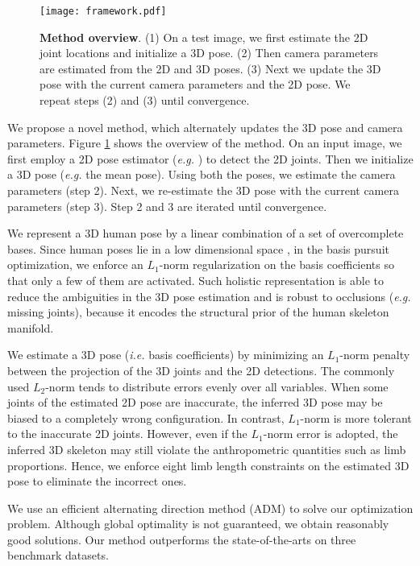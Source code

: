 \documentclass[10pt,twocolumn,letterpaper]{article}
\begin{document}
\begin{figure}
\centering
\texttt{[image: framework.pdf]}
\caption{\textbf{Method overview}. (1) On a test image, we first estimate the 2D joint locations and initialize a 3D pose. (2) Then camera parameters are estimated from the 2D and 3D poses. (3) Next we update the 3D pose with the current camera parameters and the 2D pose. We repeat steps (2) and (3) until convergence.}
\label{fig:framework}
\end{figure}

We propose a novel method, which alternately updates the 3D pose and camera parameters. Figure \ref{fig:framework} shows the overview of the method. On an input image, we first employ a 2D pose estimator ({\it e.g.} \cite{Yang2D}) to detect the 2D joints. Then we initialize a 3D pose ({\it e.g.} the mean pose). Using both the poses, we estimate the camera parameters (step 2). Next, we re-estimate the 3D pose with the current camera parameters (step 3). Step 2 and 3 are iterated until convergence.

We represent a 3D human pose by a linear combination of a set of overcomplete bases. Since human poses lie in a low dimensional space \cite{elgammal2004inferring}, in the basis pursuit optimization, we enforce an $L_1$-norm regularization on the basis coefficients so that only a few of them are activated. Such holistic representation is able to reduce the ambiguities in the 3D pose estimation and is robust to occlusions ({\it e.g.} missing joints), because it encodes the structural prior of the human skeleton manifold.

We estimate a 3D pose ({\em i.e.} basis coefficients) by minimizing an $L_1$-norm penalty between the projection of the 3D joints and the 2D detections. The commonly used $L_2$-norm tends to distribute errors evenly over all variables. When some joints of the estimated 2D pose are inaccurate, the inferred 3D pose may be biased to a completely wrong configuration. In contrast, $L_1$-norm is more tolerant to the inaccurate 2D joints. However, even if the $L_1$-norm error is adopted, the inferred 3D skeleton may still violate the anthropometric quantities such as limb proportions. Hence, we enforce eight limb length constraints on the estimated 3D pose to eliminate the incorrect ones.

We use an efficient alternating direction method (ADM) to solve our optimization problem. Although global optimality is not guaranteed, we obtain reasonably good solutions. Our method outperforms the state-of-the-arts on three benchmark datasets.
\end{document}
